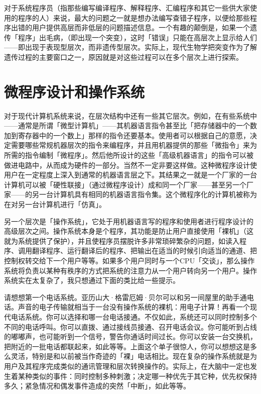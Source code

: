 \documentclass[
  12pt,
  twoside,
  openright,
  oldfontcommands,
]{memoir}
\begin{document}
对于系统程序员（指那些编写编译程序、解释程序、汇编程序和其它一些供大家使用的程序的人）来说，最大的问题之一就是想办法编写查错子程序，以便给那些程序出错的用户提供高层而非低层的问题描述信息。一个有趣的颠倒是，如果一个遗传「程序」出毛病，（即出现一个突变），这时「错误」只能在高层次上显示给人们------即出现于表现型层次，而非遗传型层次。实际上，现代生物学把突变作为了解遗传过程的主要窗口之一，原因就是对这些过程可以在多个层次上进行探索。

\section{微程序设计和操作系统}

对于现代计算机系统来说，在层次结构中还有一些其它层次。例如，在有些系统中------通常是所谓「微型计算机」------其机器语言指令甚至比「把存储器中的一个数加到寄存器中的一个数上」那样的指令还要基本。使用者可以根据自己的意愿，决定需要哪些常规机器层次的指令来编程序，并且用机器提供的那些「微指令」来为所需的指令编制「微程序」。然后他所设计的这些「高级机器语言」的指令可以被做进电路中，从而成为硬件的一部分。当然不一定非要这样做。这种微程序设计使用户在一定程度上深入到通常的机器语言层之下。其结果之一就是一个厂家的一台计算机可以被「硬性联接」（通过微程序设计）成和同一个厂家------甚至另一个厂家------的另一台计算机具有相同的机器语言指令集。这个微程序化的计算机被称为在对另一台计算机进行「仿真」。

另一个层次是「操作系统」，它处于用机器语言写的程序和使用者进行程序设计的高级层次之间。操作系统本身是个程序，其功能是防止用户直接使用「裸机」（这就为系统提供了保护），并且使程序员摆脱许多非常琐碎繁杂的问题，如读入程序、调用翻译程序、运行翻译后的程序、把输出在适当的时候引向适当的通道、把控制权转交给下一个用户等等。如果多个用户同时与一个CPU「交谈」，那么操作系统将负责以某种有秩序的方式把系统的注意力从一个用户转向另一个用户。操作系统实在太复杂了，我只想通过下面的类比给一些提示。

请想想第一个电话系统。亚历山大·格雷厄姆·贝尔可以和另一间屋里的助手通电话。声音的电子传输就相当于一台没有操作系统的裸机：用电子计算！再看一个现代电话系统。你可以选择和哪一台电话接通。不仅如此，系统还可以同时控制多个不同的电话呼叫。你可以直拨、通过接线员接通、召开电话会议。你可能听到占线的嘟嘟声，也可能听到一个信号，警告你通话时间过长。你可以安装一台交换机，把附近的一批电话都联起来，如此等等。上面这个单子很惊人，你可以想想这是多么灵活，特别是和以前被当作奇迹的「裸」电话相比。现在复杂的操作系统就是为用户及其程序完成类似的通讯管理和层次转换操作的。实际上，在大脑中一定也发生着某种类似的事件：同时控制多种刺激；决定哪一种优先于其它种，优先权保持多久；紧急情况和偶发事件造成的突然「中断」，如此等等。
\end{document}
